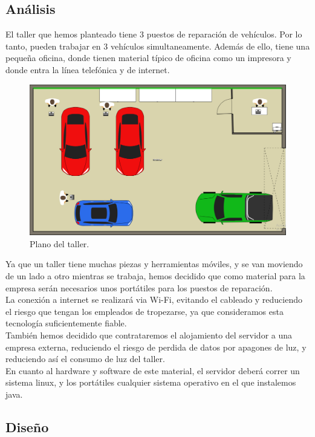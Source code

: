 \documentclass{article}
\begin{document}
\subsection{Análisis}
El taller que hemos planteado tiene 3 puestos de reparación de vehículos. Por lo tanto, pueden trabajar en 3 vehículos simultaneamente.
Además de ello, tiene una pequeña oficina, donde tienen material típico de oficina como un impresora y donde entra la línea telefónica y de internet.
\begin{figure}[H]
  \centering
  \includegraphics[width=1.0\textwidth]{misc/planoTaller.PNG}
  \caption{Plano del taller.}
\end{figure}
Ya que un taller tiene muchas piezas y herramientas móviles, y se van moviendo de un lado a otro mientras se trabaja, 
hemos decidido que como material para la empresa serán necesarios unos portátiles para los puestos de reparación.\\
La conexión a internet se realizará via Wi-Fi, evitando el cableado y reduciendo el riesgo que tengan los empleados de 
tropezarse, ya que consideramos esta tecnología suficientemente fiable.\\ 
También hemos decidido que contrataremos el alojamiento del servidor a una empresa externa, reduciendo el riesgo de perdida de datos por apagones de 
luz, y reduciendo así el consumo de luz del taller. \\ En cuanto al hardware y software de este material, el servidor deberá correr un sistema linux, 
y los portátiles cualquier sistema operativo en el que instalemos java.
\subsection{Diseño} 
\end{document}
